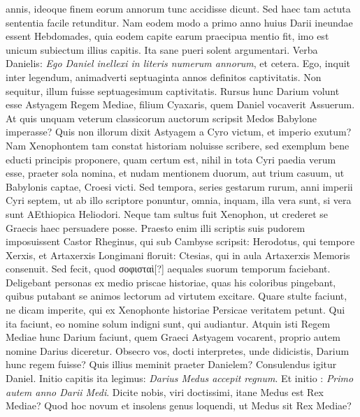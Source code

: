 annis, ideoque finem eorum annorum tunc accidisse dicunt.
Sed haec tam actuta sententia facile retunditur.
Nam eodem modo
a primo anno huius Darii ineundae essent Hebdomades, quia eodem
capite earum praecipua mentio fit, imo est unicum subiectum illius
capitis.
Ita sane pueri solent argumentari.
Verba Danielis: \textit{Ego
Daniel inellexi in literis numerum annorum}, et cetera.
Ego, inquit inter
legendum, animadverti septuaginta annos definitos captivitatis.
Non sequitur, illum fuisse septuagesimum captivitatis.
Rursus hunc
Darium volunt esse Astyagem Regem Mediae, filium Cyaxaris,
quem Daniel vocaverit Assuerum.
At quis unquam veterum classicorum
auctorum scripsit Medos Babylone imperasse?
Quis non
illorum dixit Astyagem a Cyro victum, et imperio exutum?
Nam Xenophontem tam constat historiam noluisse scribere, sed exemplum
bene educti principis proponere, quam certum est, nihil in tota Cyri
paedia verum esse, praeter sola nomina, et nudam mentionem duorum,
aut trium casuum, ut Babylonis captae, Croesi victi.
%
Sed tempora,
series gestarum rurum, anni imperii Cyri septem, ut ab illo
scriptore ponuntur, omnia, inquam, illa vera sunt, si vera sunt AEthiopica
Heliodori.
Neque tam sultus fuit Xenophon, ut crederet se
Graecis haec persuadere posse.
Praesto enim illi scriptis suis pudorem
imposuissent Castor Rheginus, qui sub Cambyse scripsit: Herodotus,
qui tempore Xerxis, et Artaxerxis Longimani floruit: Ctesias, qui in
aula Artaxerxis Memoris consenuit.
Sed fecit, quod \textgreek{σοφισταὶ[?]} aequales
suorum temporum faciebant.
Deligebant personas ex medio priscae
historiae, quas his coloribus pingebant, quibus putabant se animos
lectorum ad virtutem excitare.
Quare stulte faciunt, ne dicam
imperite, qui ex Xenophonte historiae Persicae veritatem petunt.
Qui ita faciunt, eo nomine solum indigni sunt, qui audiantur.
Atquin isti Regem Mediae hunc Darium faciunt, quem Graeci Astyagem
vocarent, proprio autem nomine Darius diceretur.
Obsecro
vos, docti interpretes, unde didicistis, Darium hunc regem fuisse?
Quis illius meminit praeter Danielem?
Consulendus igitur Daniel.
Initio  capitis ita legimus:
 \textit{Darius Medus accepit regnum}.
Et initio : \textit{Primo autem anno Darii Medi}.
Dicite nobis, viri doctissimi, itane
Medus est Rex Mediae?
Quod hoc novum et insolens genus loquendi,
ut Medus sit Rex Mediae?
